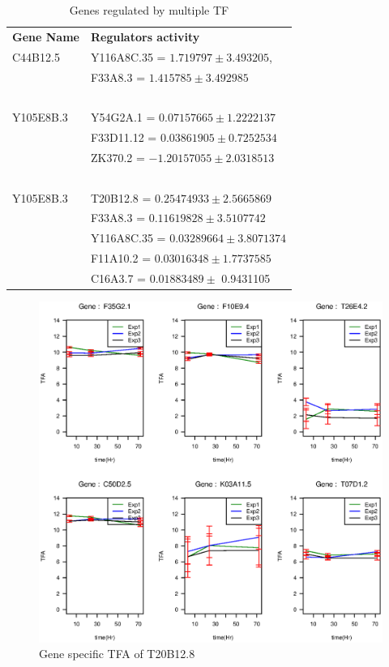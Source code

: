 \documentclass[12pt]{article}
\begin{document}
\begin{table}[!htdp]
  \begin{tabular}{l l }
	      \textbf{Gene Name} & \textbf{Regulators activity} \\
	      {\color{red}C44B12.5} & {\color{blue} Y116A8C.35 }= $ 1.719797 \pm 3.493205 $, \\ 
				    & {\color{blue}F33A8.3} = $ 1.415785 \pm 3.492985$ \\~\\

		{\color{red}Y105E8B.3} & {\color{blue} Y54G2A.1} = $ 0.07157665 \pm 1.2222137 $ \\
		  & {\color{blue} F33D11.12} = $ 0.03861905 \pm 0.7252534 $ \\
 		  & {\color{blue} ZK370.2} = $ -1.20157055 \pm  2.0318513 $\\~\\
		    
	      {\color{red} Y105E8B.3} & {\color{blue} T20B12.8 } = $ 0.25474933 \pm  2.5665869 $ \\
		  			& {\color{blue} F33A8.3 } = $ 0.11619828  \pm  3.5107742 $ \\
 		  			& {\color{blue} Y116A8C.35 } = $ 0.03289664 \pm  3.8071374 $ \\
					& {\color{blue} F11A10.2 } = $ 0.03016348 \pm 1.7737585 $ \\
 		  			& {\color{blue} C16A3.7  } = $ 0.01883489 \pm  $ 0.9431105\\
  \end{tabular}
  \caption{Genes regulated by multiple TF}
  \label{table:gene_regulation}
\end{table}

\begin{figure}[!htb]
  \includegraphics[width=1.0\linewidth]{picture/T20B12_8_3dp_CE_YH_tfid19.eps}
  \caption{Gene specific TFA of T20B12.8}
  \label{fig:T20B12.8}
\end{figure}
\end{document}
